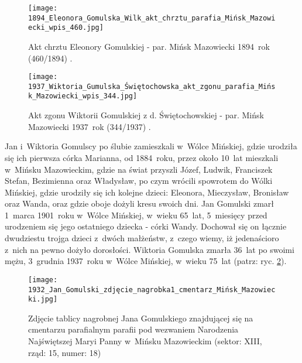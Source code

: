 \begin{figure}[!ht]
    \vspace*{0.5cm}
    \centering \texttt{[image: 
        1894\_Eleonora\_Gomulska\_Wilk\_akt\_chrztu\_parafia\_Mińsk\_Mazowiecki\_wpis\_460.jpg]}
    \captionsetup{format=hang}
    \caption{Akt chrztu Eleonory Gomulskiej - par. Mińsk Mazowiecki
    1894~rok (460/1894)
    \cite{par_minsk2}.}
    \label{fig:egomulska_1894}
\end{figure}

\begin{figure}[!ht]
    \vspace*{0.5cm}
    \centering \texttt{[image: 
        1937\_Wiktoria\_Gumulska\_Świętochowska\_akt\_zgonu\_parafia\_Mińsk\_Mazowiecki\_wpis\_344.jpg]}
    \captionsetup{format=hang}
    \caption{Akt zgonu Wiktorii Gomulskiej z d. Świętochowskiej - par. Mińsk Mazowiecki 
    1937~rok (344/1937) \cite{par_minsk2}.}
    \label{fig:wgomulska_1937}
\end{figure}

Jan i~Wiktoria Gomulscy po ślubie zamieszkali w~Wólce Mińskiej, gdzie
urodziła się ich pierwsza córka Marianna, od 1884~roku, przez około 10~lat
mieszkali w~Mińsku Mazowieckim, gdzie na świat przyszli Józef, Ludwik,
Franciszek Stefan, Bezimienna oraz Władysław, po czym wrócili spowrotem do
Wólki Mińskiej, gdzie urodziły się ich kolejne dzieci: Eleonora, Mieczysław,
Bronisław oraz Wanda, oraz gdzie oboje dożyli kresu swoich dni. Jan Gomulski
zmarł 1~marca 1901~roku w~Wólce Mińskiej, w~wieku 65~lat, 5~miesięcy przed
urodzeniem się jego ostatniego dziecka - córki Wandy. Dochował się on łącznie
dwudziestu trojga dzieci z~dwóch małżeństw, z~czego wiemy, iż jedenaścioro
z~nich na pewno dożyło dorosłości. Wiktoria Gomulska zmarła 36~lat po swoimi
mężu, 3~grudnia 1937~roku w~Wólce Mińskiej, w~wieku 75~lat (patrz: ryc. 
\ref{fig:wgomulska_1937}).

\begin{figure}[!ht]
    \vspace*{0.4cm}
    \centering \texttt{[image: 
        1932\_Jan\_Gomulski\_zdjęcie\_nagrobka1\_cmentarz\_Mińsk\_Mazowiecki.jpg]}
    \captionsetup{format=hang}
    \caption{Zdjęcie tablicy nagrobnej Jana Gomulskiego znajdującej się na
    cmentarzu parafialnym parafii pod wezwaniem Narodzenia Najświętszej Maryi
    Panny w~Mińsku Mazowieckim (sektor: XIII, rząd: 15, numer: 18)}
    \label{fig:jgomulski_1932}
\end{figure}

